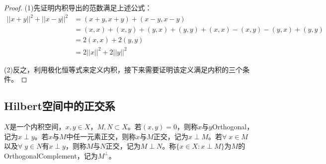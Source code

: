 \begin{proof}
	(1)先证明内积导出的范数满足上述公式：
	\begin{align*}
		||x+y||^2+||x-y||^2&=(x+y,x+y)+(x-y,x-y) \\
		&=(x,x)+(x,y)+(y,x)+(y,y)+(x,x)-(x,y)-(y,x)+(y,y) \\
		&=2(x,x)+2(y,y) \\
		&=2||x||^2+2||y||^2
	\end{align*}\par
	(2)反之，利用极化恒等式来定义内积，接下来需要证明该定义满足内积的三个条件。\par
\end{proof}

\subsection{Hilbert空间中的正交系}
\begin{definition}
	$X$是一个内积空间，$x,y\in X$，$M,N\subset X$。若$(x,y)=0$，则称$x$与$y$\gls{Orthogonal}，记为$x\perp y$。若$x$与$M$中任一元素正交，则称$x$与$M$正交，记为$x\perp M$。若$\forall\;x\in M$以及$\forall\;y\in N$有$x\perp y$，则称$M$与$N$正交，记为$M\perp N$。称$\{x\in X:x\perp M\}$为$M$的\gls{OrthogonalComplement}，记为$M^{\perp}$。
\end{definition}
